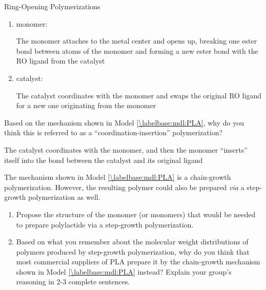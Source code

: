 \begin{activity}{Ring-Opening Polymerizations}
\begin{ctqs}
		\begin{enumerate}
			\item monomer:
			
				\begin{solution}[0.5in]
					The monomer attaches to the metal center and opens up, breaking one ester bond between atoms of the monomer and forming a new ester bond with the RO ligand from the catalyst
				\end{solution}
			
			\item catalyst:
			
				\begin{solution}[0.5in]
					The catalyst coordinates with the monomer and swaps the original RO ligand for a new one originating from the monomer
				\end{solution}
				
		\end{enumerate}
		
	\question Based on the mechanism shown in Model \ref{\labelbase:mdl:PLA}, why do you think this is referred to as a ``coordination-insertion'' polymerization?
			
				\begin{solution}[1in]
					The catalyst coordinates with the monomer, and then the monomer ``inserts'' itself into the bond between the catalyst and its original ligand
				\end{solution}
	
	\question The mechanism shown in Model \ref{\labelbase:mdl:PLA} is a chain-growth polymerization.  However, the resulting polymer could also be prepared \emph{via} a step-growth polymerization as well.
	
		\begin{enumerate}
			\item Propose the structure of the monomer (or monomers) that would be needed to prepare polylactide via a step-growth polymerization.
			
				\begin{solution}[1in]\end{solution}
			
			\item Based on what you remember about the molecular weight distributions of polymers produced by step-growth polymerization, why do you think that most commercial suppliers of PLA prepare it by the chain-growth mechanism shown in Model \ref{\labelbase:mdl:PLA} instead?  Explain your group's reasoning in 2-3 complete sentences.
			

\end{enumerate}
\end{ctqs}
\end{activity}
